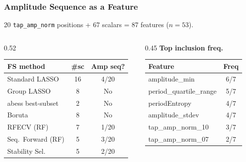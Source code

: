 \documentclass[aspectratio=169]{beamer}
\begin{document}
\begin{frame}
    \frametitle{Amplitude Sequence as a Feature}
    \footnotesize
    20 \texttt{tap\_amp\_norm} positions + 67 scalars = 87 features ($n{=}53$).
    \begin{columns}[T]
        \begin{column}{0.52\textwidth}
            \centering
            \scriptsize
            \setlength{\tabcolsep}{3pt}
            \begin{tabular}{lcc}
                \toprule
                \textbf{FS method} & \textbf{\#sc} & \textbf{Amp seq?} \\
                \midrule
                Standard LASSO      & 16 & \cellcolor{green!15}4/20 \\
                Group LASSO         & 8  & No \\
                abess best-subset   & 2  & No \\
                Boruta              & 8  & No \\
                RFECV (RF)          & 7  & \cellcolor{green!15}1/20 \\
                Seq.\ Forward (RF)  & 5  & \cellcolor{green!15}3/20 \\
                Stability Sel.      & 5  & \cellcolor{green!15}2/20 \\
                \bottomrule
            \end{tabular}
        \end{column}
        \begin{column}{0.45\textwidth}
            \centering
            \textbf{Top inclusion freq.}\\
            \scriptsize
            \setlength{\tabcolsep}{3pt}
            \begin{tabular}{lc}
                \toprule
                \textbf{Feature} & \textbf{Freq} \\
                \midrule
                amplitude\_min          & 6/7 \\
                period\_quartile\_range & 5/7 \\
                periodEntropy           & 4/7 \\
                amplitude\_stdev        & 4/7 \\
                \cellcolor{green!15}tap\_amp\_norm\_10 & \cellcolor{green!15}3/7 \\
                \cellcolor{green!15}tap\_amp\_norm\_07 & \cellcolor{green!15}2/7 \\

\end{tabular}
\end{column}
\end{columns}
\end{frame}
\end{document}
